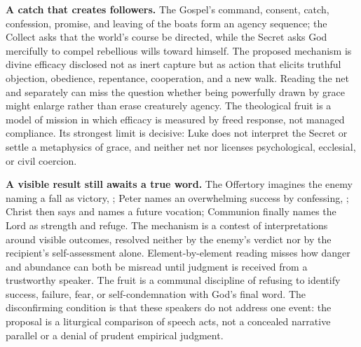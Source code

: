 \noindent\textbf{A catch that creates followers.\enspace{}}
The Gospel's command, consent, catch, confession, promise, and leaving of the boats form an agency sequence; the Collect asks that the world's course be directed, while the Secret asks God mercifully to compel rebellious wills toward himself. The proposed mechanism is divine efficacy disclosed not as inert capture but as action that elicits truthful objection, obedience, repentance, cooperation, and a new walk. Reading the net and  separately can miss the question whether being powerfully drawn by grace might enlarge rather than erase creaturely agency. The theological fruit is a model of mission in which efficacy is measured by freed response, not managed compliance. Its strongest limit is decisive: Luke does not interpret the Secret or settle a metaphysics of grace, and neither net nor  licenses psychological, ecclesial, or civil coercion.

\noindent\textbf{A visible result still awaits a true word.\enspace{}}
The Offertory imagines the enemy naming a fall as victory, ; Peter names an overwhelming success by confessing, ; Christ then says  and names a future vocation; Communion finally names the Lord as strength and refuge. The mechanism is a contest of interpretations around visible outcomes, resolved neither by the enemy's verdict nor by the recipient's self-assessment alone. Element-by-element reading misses how danger and abundance can both be misread until judgment is received from a trustworthy speaker. The fruit is a communal discipline of refusing to identify success, failure, fear, or self-condemnation with God's final word. The disconfirming condition is that these speakers do not address one event: the proposal is a liturgical comparison of speech acts, not a concealed narrative parallel or a denial of prudent empirical judgment.
